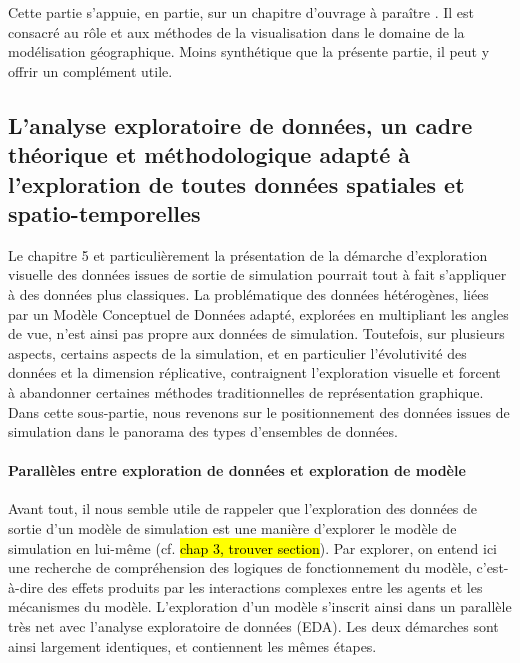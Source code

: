 \begin{tcolorbox}[breakable,left=0pt,right=0pt,top=0pt,bottom=0pt,
	colback=gray!15,colframe=gray!15,width=\dimexpr\textwidth\relax, 
	enlarge left by=0mm, boxsep=5pt,arc=0pt,outer arc=0pt]
	Cette partie s'appuie, en partie, sur un chapitre d'ouvrage à paraître \autocite{cura_visualisation_2020}.
	Il est consacré au rôle et aux méthodes de la visualisation dans le domaine de la modélisation géographique.
	Moins synthétique que la présente partie, il peut y offrir un complément utile.
\end{tcolorbox}


\subsection{L'analyse exploratoire de données, un cadre théorique et méthodologique adapté à l'exploration de toutes données spatiales et spatio-temporelles \label{subsec:genericite-donnees-simul}}

Le chapitre 5 et particulièrement la présentation de la démarche d'exploration visuelle des données issues de sortie de simulation pourrait tout à fait s'appliquer à des données plus classiques.
La problématique des données hétérogènes, liées par un Modèle Conceptuel de Données adapté, explorées en multipliant les angles de vue, n'est ainsi pas propre aux données de simulation.
Toutefois, sur plusieurs aspects, certains aspects de la simulation, et en particulier l'évolutivité des données et la dimension réplicative, contraignent l'exploration visuelle et forcent à abandonner certaines méthodes traditionnelles de représentation graphique.
Dans cette sous-partie, nous revenons sur le positionnement des données issues de simulation dans le panorama des types d'ensembles de données.

\paragraph{Parallèles entre exploration de données et exploration de modèle}
Avant tout, il nous semble utile de rappeler que l'exploration des données de sortie d'un modèle de simulation est une manière d'explorer le modèle de simulation en lui-même (cf. \hl{chap 3, trouver section}).
Par explorer, on entend ici une recherche de compréhension des logiques de fonctionnement du modèle, c'est-à-dire des effets produits par les interactions complexes entre les agents et les mécanismes du modèle.
L'exploration d'un modèle s'inscrit ainsi dans un parallèle très net avec l'analyse exploratoire de données (EDA).
Les deux démarches sont ainsi largement identiques, et contiennent les mêmes étapes.

